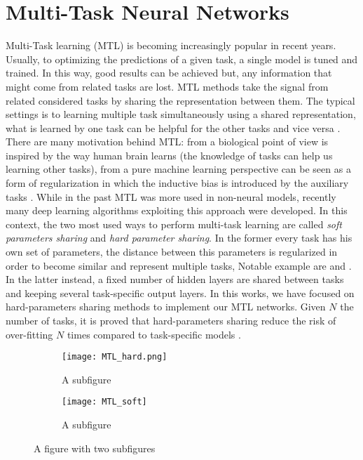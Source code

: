 \section{Multi-Task Neural Networks}\label{sec:MTLsection}
Multi-Task learning (MTL) is becoming increasingly popular in recent years.
Usually, to optimizing the predictions of a given task, a single model is
tuned and trained. In this way, good results can be achieved but, any
information that might come from related tasks are lost. MTL methods take
the signal from related considered tasks by sharing the
representation between them. The typical settings is to learning multiple
task simultaneously using a shared representation, what is learned by one
task can be helpful for the other tasks and vice versa \cite{Caruana97}.
There are many motivation behind MTL: from a biological point of view is
inspired by the way human brain learns (the knowledge of tasks can help us
learning other tasks), from a pure machine learning perspective
can be seen as a form of regularization in which the inductive bias is
introduced by the auxiliary tasks \cite{Ruder2017}. While in the past MTL
was more used in non-neural models, recently many deep learning algorithms
exploiting this approach were developed. In this context, the two
most used ways to perform multi-task learning are called \emph{soft
parameters sharing} and \emph{hard parameter sharing}. In the former
every task has his own set of parameters, the distance between this
parameters is regularized in order to become similar and represent
multiple tasks, Notable example are \cite{duong-etal-2015-low} and
\cite{yang2016trace}. In the latter instead, a fixed number of hidden
layers are shared between tasks and keeping several task-specific output
layers. In this works, we have focused on hard-parameters sharing methods
to implement our MTL networks. Given $N$ the number of tasks, it is proved
that hard-parameters sharing reduce the risk of over-fitting $N$ times
compared to task-specific models \cite{baxter1997}.
\begin{figure}
\centering
\begin{subfigure}{.5\textwidth}
  \centering
  \texttt{[image: MTL\_hard.png]}
  \caption{A subfigure}
  \label{fig:sub1}
\end{subfigure}%
\begin{subfigure}{.5\textwidth}
  \centering
  \texttt{[image: MTL\_soft]}
  \caption{A subfigure}
  \label{fig:sub2}
\end{subfigure}
\caption{A figure with two subfigures}
\label{fig:test}
\end{figure}

